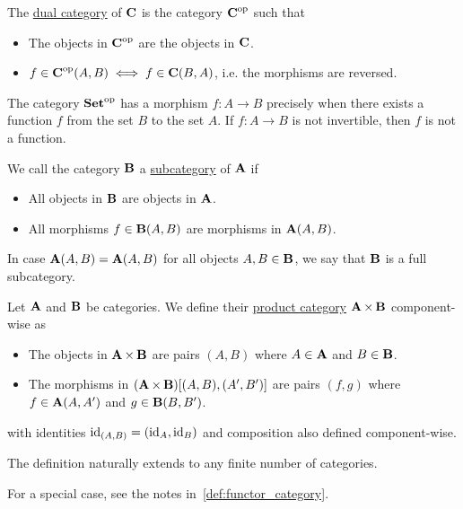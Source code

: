\begin{definition}\label{def:dual_category}\cite[construction 1.1.9]{Leinster2014}
  The \uline{dual category} of $\operatorname{\mathbf{C}}$ is the category $\operatorname{\mathbf{C}}^{\operatorname{op}}$ such that
  \begin{itemize}
    \item The objects in $\operatorname{\mathbf{C}}^{\operatorname{op}}$ are the objects in $\operatorname{\mathbf{C}}$.
    \item $f \in \operatorname{\mathbf{C}}^{\operatorname{op}}(A, B) \iff f \in \operatorname{\mathbf{C}}(B, A)$, i.e. the morphisms are reversed.
  \end{itemize}
\end{definition}

\begin{example}
  The category $\operatorname{\mathbf{Set}}^{\operatorname{op}}$ has a morphism $f: A \to B$ precisely when there exists a function $f$ from the set $B$ to the set $A$. If $f: A \to B$ is not invertible, then $f$ is not a function.
\end{example}

\begin{definition}\label{def:subcategory}\cite[definition 1.2.18]{Leinster2014}
  We call the category $\operatorname{\mathbf{B}}$ a \uline{subcategory} of $\operatorname{\mathbf{A}}$ if
  \begin{itemize}
    \item All objects in $\operatorname{\mathbf{B}}$ are objects in $\operatorname{\mathbf{A}}$.
    \item All morphisms $f \in \operatorname{\mathbf{B}}(A, B)$ are morphisms in $\operatorname{\mathbf{A}}(A, B)$.
  \end{itemize}

  In case $\operatorname{\mathbf{A}}(A, B) = \operatorname{\mathbf{A}}(A, B)$ for all objects $A, B \in \operatorname{\mathbf{B}}$, we say that $\operatorname{\mathbf{B}}$ is a full subcategory.
\end{definition}

\begin{definition}\label{def:product_category}\cite[exercise 1.1.14]{Leinster2014}
  Let $\operatorname{\mathbf{A}}$ and $\operatorname{\mathbf{B}}$ be categories. We define their \uline{product category} $\operatorname{\mathbf{A}} \times \operatorname{\mathbf{B}}$ component-wise as
  \begin{itemize}
    \item The objects in $\operatorname{\mathbf{A}} \times \operatorname{\mathbf{B}}$ are pairs $(A, B)$ where $A \in \operatorname{\mathbf{A}}$ and $B \in \operatorname{\mathbf{B}}$.
    \item The morphisms in $(\operatorname{\mathbf{A}} \times \operatorname{\mathbf{B}})[(A, B), (A', B')]$ are pairs $(f, g)$ where $f \in \operatorname{\mathbf{A}}(A, A')$ and $g \in \operatorname{\mathbf{B}}(B, B')$.
  \end{itemize}
  with identities $\operatorname{id}_{(A,B)} =(\operatorname{id}_A, \operatorname{id}_B)$ and composition also defined component-wise.

  The definition naturally extends to any finite number of categories.

  For a special case, see the notes in~\cref{def:functor_category}.
\end{definition}
